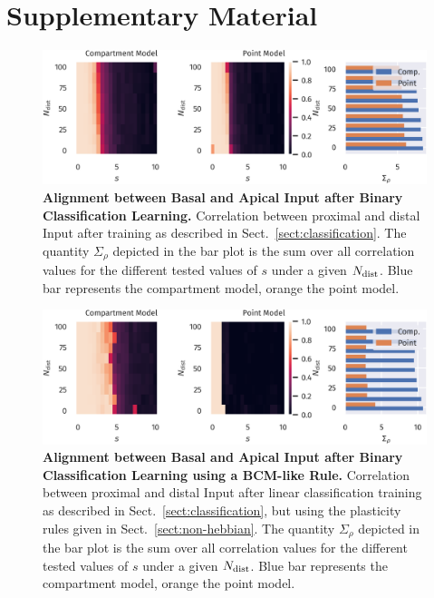 \documentclass[utf8]{frontiersSCNS} %
\begin{document}
\section{Supplementary Material}
\begin{figure}[t]
\centering
\includegraphics[width=1.0\columnwidth]{classification_correlation_dimension_scaling_high_input_dim}
\caption{{\bf Alignment between Basal and Apical Input after Binary Classification Learning.}
	Correlation between proximal and distal Input after training as described in 
	Sect.~\ref{sect:classification}. The quantity $\Sigma_{\rho}$ depicted in the bar
	plot is the sum over all correlation values for the different tested values
	of $s$ under a given $N_{\rm dist}$. Blue bar represents the compartment model,
	orange the point model.}
\label{fig:classification_correlation}
\end{figure}

\begin{figure}[t]
\centering
\includegraphics[width=1.0\columnwidth]{classification_correlation_dimension_scaling_bcm_high_input_dim}
\caption{{\bf Alignment between Basal and Apical Input after Binary Classification Learning
		using a BCM-like Rule.}
	Correlation between proximal and distal Input after linear classification 
	training as described in Sect.~\ref{sect:classification}, but using the plasticity
	rules given in Sect.~\ref{sect:non-hebbian}. The quantity $\Sigma_{\rho}$ depicted in the bar
	plot is the sum over all correlation values for the different tested values
	of $s$ under a given $N_{\rm dist}$. Blue bar represents the compartment model,
	orange the point model.}
\label{fig:classification_correlation_bcm}
\end{figure}
\end{document}

